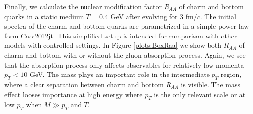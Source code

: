 Finally, we calculate the nuclear modification factor $R_{AA}$ of charm and bottom quarks in a static medium $T=0.4$ GeV after evolving for $3$ fm/$c$.
The initial spectra of the charm and bottom quarks are parametrized in a simple power law form {Cao:2012jt}.
This simplified setup is intended for comparison with other models with controlled settings.
In Figure \ref{plots:BoxRaa} we show both $R_{AA}$ of charm and bottom with or without the gluon absorption process. 
Again, we see that the absorption process only affects observables for relatively low momenta $p_T < 10$ GeV.
The mass plays an important role in the intermediate $p_T$ region, where a clear separation between charm and bottom $R_{AA}$ is visible.
The mass effect looses importance at high energy where $p_T$ is the only relevant scale or at low $p_T$ when $M \gg p_T$ and $T$. 

